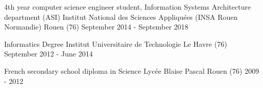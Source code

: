 

\begin{cventries}

  \cventryFour
    {4th year computer science engineer student, Information Systems Architecture department (ASI)} %
    {Institut National des Sciences Appliquées (INSA Rouen Normandie)} %
    {Rouen (76)} %
    {September 2014 - September 2018} %
    
  \cventryFour
	{Informatics Degree} %
	{Institut Universitaire de Technologie} %
	{Le Havre (76)} %
	{September 2012 - June 2014} %
	{}
	
  \cventryFour
	{French secondary school diploma in Science} %
	{Lycée Blaise Pascal} %
	{Rouen (76)} %
	{2009 - 2012} %
	{}
	
	
\end{cventries}
